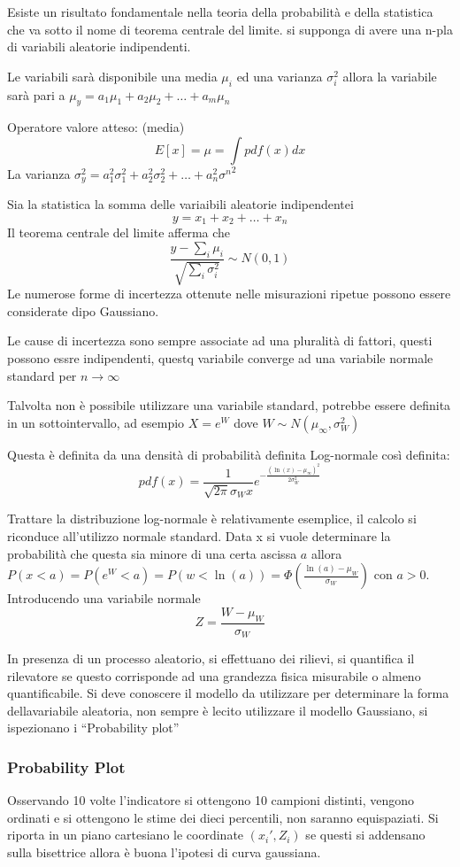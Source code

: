 Esiste un risultato fondamentale nella teoria della probabilità e della statistica che va sotto il nome di teorema centrale del limite. si supponga di avere una n-pla di variabili aleatorie indipendenti.

Le variabili sarà disponibile una media $\mu_i$ ed una varianza $\sigma_i^2$
allora la variabile sarà pari a $\mu_y = a_1\mu_1 + a_2\mu_2 + \ldots + a_m \mu_n$

Operatore valore atteso: (media)
$$
E[x] = \mu = \int pdf(x) dx
$$
La varianza $\sigma^2_y = a_1^2\sigma^2_1 + a_2^2\sigma_2^2 + \ldots + a_n^2{\sigma^n}^2 
$

Sia la statistica la somma delle variaibili aleatorie indipendentei
$$
y = x_1 + x_2 + \ldots + x_n
$$
Il teorema centrale del limite afferma che 
$$
\frac{y-\sum_i \mu_i}{\sqrt{\sum_i \sigma^2_i}} \sim N(0,1)
$$
Le numerose forme di incertezza ottenute nelle misurazioni ripetue possono essere considerate dipo Gaussiano.

Le cause di incertezza sono sempre associate ad una pluralità di fattori, questi possono essre indipendenti, questq variabile converge ad una variabile normale standard per $n\to\infty$

Talvolta non è possibile utilizzare una variabile standard, potrebbe essere definita in un sottointervallo, ad esempio $X=e^W$ dove $W\sim N(\mu_\infty,\sigma^2_W)$

Questa è definita da una densità di probabilità definita Log-normale così definita:
$$
pdf(x) = \frac{1}{\sqrt{2\pi} \sigma_W x} e^{-\frac{(\ln(x)-\mu_\infty)^2}{2\sigma^2_W}}
$$

Trattare la distribuzione log-normale è relativamente esemplice, il calcolo si riconduce all'utilizzo normale standard.
Data x si vuole determinare la probabilità che questa sia minore di una certa ascissa $a$ allora $P(x<a) = P(e^W<a) = P(w< \ln(a)) = \Phi(\frac{\ln(a)-\mu_W}{\sigma_W})$
con $a>0$.
Introducendo una variabile normale 
$$
Z  = \frac{W-\mu_W}{\sigma_W}
$$

In presenza di un processo aleatorio, si effettuano dei rilievi, si quantifica 
il rilevatore se questo corrisponde ad una grandezza fisica misurabile o almeno 
quantificabile.
Si deve conoscere il modello da utilizzare per determinare la forma 
dellavariabile aleatoria, non sempre è lecito utilizzare il modello Gaussiano, 
si ispezionano i ``Probability plot''

\subsubsection{Probability Plot} Osservando 10 volte l'indicatore si ottengono 
10 campioni distinti, vengono ordinati e si ottengono le stime dei dieci 
percentili, non saranno equispaziati.
Si riporta in un piano cartesiano le coordinate $(x_i',Z_i)$ se questi si 
addensano sulla bisettrice allora è buona l'ipotesi di curva gaussiana.


